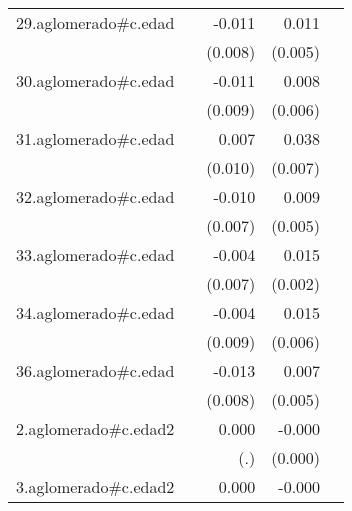 {\begin{longtable}{l*{4}{D{.}{.}{-1}}}
\addlinespace
29.aglomerado#c.edad&                     &      -0.011         &       0.011\sym{*}  &                     \\
            &                     &     (0.008)         &     (0.005)         &                     \\
\addlinespace
30.aglomerado#c.edad&                     &      -0.011         &       0.008         &                     \\
            &                     &     (0.009)         &     (0.006)         &                     \\
\addlinespace
31.aglomerado#c.edad&                     &       0.007         &       0.038\sym{***}&                     \\
            &                     &     (0.010)         &     (0.007)         &                     \\
\addlinespace
32.aglomerado#c.edad&                     &      -0.010         &       0.009\sym{*}  &                     \\
            &                     &     (0.007)         &     (0.005)         &                     \\
\addlinespace
33.aglomerado#c.edad&                     &      -0.004         &       0.015\sym{***}&                     \\
            &                     &     (0.007)         &     (0.002)         &                     \\
\addlinespace
34.aglomerado#c.edad&                     &      -0.004         &       0.015\sym{*}  &                     \\
            &                     &     (0.009)         &     (0.006)         &                     \\
\addlinespace
36.aglomerado#c.edad&                     &      -0.013         &       0.007         &                     \\
            &                     &     (0.008)         &     (0.005)         &                     \\
\addlinespace
2.aglomerado#c.edad2&                     &       0.000         &      -0.000\sym{*}  &                     \\
            &                     &         (.)         &     (0.000)         &                     \\
\addlinespace
3.aglomerado#c.edad2&                     &       0.000         &      -0.000\sym{**} &                     \\

\end{longtable}}
